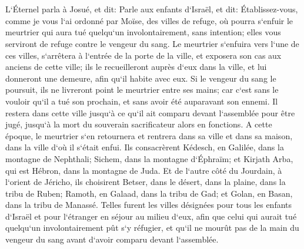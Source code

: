 \chapter{}

\verse L`Éternel parla à Josué, et dit: 
\verse Parle aux enfants d`Israël, et dit: Établissez-vous, comme je vous l`ai ordonné par Moïse, des villes de refuge, 
\verse où pourra s`enfuir le meurtrier qui aura tué quelqu`un involontairement, sans intention; elles vous serviront de refuge contre le vengeur du sang. 
\verse Le meurtrier s`enfuira vers l`une de ces villes, s`arrêtera à l`entrée de la porte de la ville, et exposera son cas aux anciens de cette ville; ils le recueilleront auprès d`eux dans la ville, et lui donneront une demeure, afin qu`il habite avec eux. 
\verse Si le vengeur du sang le poursuit, ils ne livreront point le meurtrier entre ses mains; car c`est sans le vouloir qu`il a tué son prochain, et sans avoir été auparavant son ennemi. 
\verse Il restera dans cette ville jusqu`à ce qu`il ait comparu devant l`assemblée pour être jugé, jusqu`à la mort du souverain sacrificateur alors en fonctions. A cette époque, le meurtrier s`en retournera et rentrera dans sa ville et dans sa maison, dans la ville d`où il s`était enfui. 
\verse Ils consacrèrent Kédesch, en Galilée, dans la montagne de Nephthali; Sichem, dans la montagne d`Éphraïm; et Kirjath Arba, qui est Hébron, dans la montagne de Juda. 
\verse Et de l`autre côté du Jourdain, à l`orient de Jéricho, ils choisirent Betser, dans le désert, dans la plaine, dans la tribu de Ruben; Ramoth, en Galaad, dans la tribu de Gad; et Golan, en Basan, dans la tribu de Manassé. 
\verse Telles furent les villes désignées pour tous les enfants d`Israël et pour l`étranger en séjour au milieu d`eux, afin que celui qui aurait tué quelqu`un involontairement pût s`y réfugier, et qu`il ne mourût pas de la main du vengeur du sang avant d`avoir comparu devant l`assemblée. 

\chapter{}

